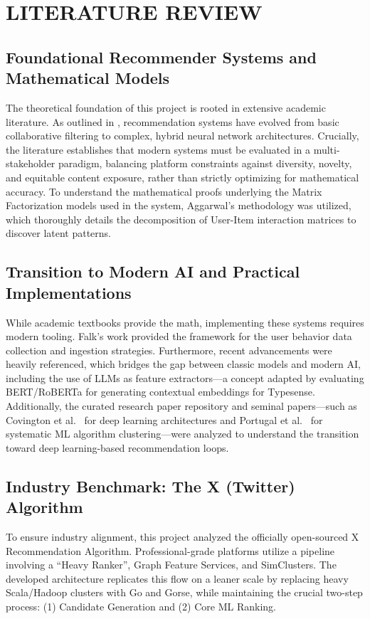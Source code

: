 \chapter{LITERATURE REVIEW}
\clearpage

\section{Foundational Recommender Systems and Mathematical Models}
The theoretical foundation of this project is rooted in extensive academic literature. As outlined in \cite{ricci2022}, recommendation systems have evolved from basic collaborative filtering to complex, hybrid neural network architectures. Crucially, the literature establishes that modern systems must be evaluated in a multi-stakeholder paradigm, balancing platform constraints against diversity, novelty, and equitable content exposure, rather than strictly optimizing for mathematical accuracy. To understand the mathematical proofs underlying the Matrix Factorization models used in the system, Aggarwal's methodology \cite{aggarwal2016} was utilized, which thoroughly details the decomposition of User-Item interaction matrices to discover latent patterns.

\section{Transition to Modern AI and Practical Implementations}
While academic textbooks provide the math, implementing these systems requires modern tooling. Falk's work \cite{falk2019} provided the framework for the user behavior data collection and ingestion strategies. Furthermore, recent advancements \cite{aliev2026} were heavily referenced, which bridges the gap between classic models and modern AI, including the use of LLMs as feature extractors---a concept adapted by evaluating BERT/RoBERTa for generating contextual embeddings for Typesense. Additionally, the curated research paper repository \cite{zhang-rspapers} and seminal papers---such as Covington et al.\ \cite{covington2016} for deep learning architectures and Portugal et al.\ \cite{portugal2015} for systematic ML algorithm clustering---were analyzed to understand the transition toward deep learning-based recommendation loops.

\section{Industry Benchmark: The X (Twitter) Algorithm}
To ensure industry alignment, this project analyzed the officially open-sourced X Recommendation Algorithm. Professional-grade platforms utilize a pipeline involving a ``Heavy Ranker'', Graph Feature Services, and SimClusters. The developed architecture replicates this flow on a leaner scale by replacing heavy Scala/Hadoop clusters with Go and Gorse, while maintaining the crucial two-step process: (1) Candidate Generation and (2) Core ML Ranking.
